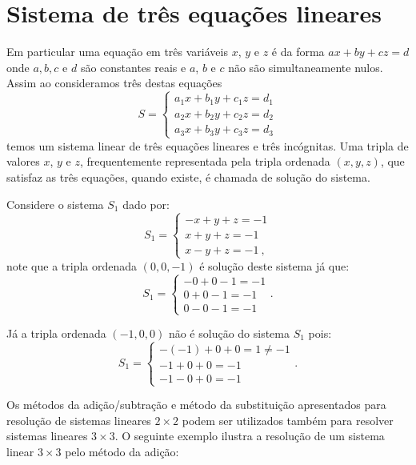 \section{Sistema de três equações lineares}

\vskip0.3cm
 \colorbox{azul}{
 \begin{minipage}{0.9\linewidth}
  Em particular uma equação em três variáveis $x$, $y$ e $z$ é da forma $ax + by + cz= d$ onde $a, b, c$ e $d$ são constantes reais e $a$, $b$ e $c$ não são simultaneamente nulos. Assim ao consideramos três destas equações
  \[S= \begin{cases}
      a_1x + b_1y + c_1z= d_1 \\
      a_2x + b_2y + c_2z= d_2 \\
      a_3x + b_3y + c_3z= d_3
     \end{cases}\]
 temos um sistema linear de três equações lineares e três incógnitas. Uma tripla de valores $x$, $y$ e $z$, frequentemente representada pela tripla ordenada $(x, y, z)$, que satisfaz as três equações, quando existe, é chamada de solução do sistema.
 \end{minipage}}
 \vskip0.3cm




\begin{exem}
 Considere o sistema $S_1$ dado por:
 \[S_1= \begin{cases}
      -x + y + z= -1 \\
      x + y + z= -1 \\
      x - y + z= -1 \ ,
     \end{cases}\]
 note que a tripla ordenada $(0, 0, -1)$ é solução deste sistema já que:
 \[S_1= \begin{cases}
      - 0 + 0 -1 = -1 \\
      0 + 0 -1 = -1\\
      0 - 0 -1 = -1
     \end{cases} .\]

Já a tripla ordenada $(-1, 0, 0)$ não é solução do sistema $S_1$ pois:
\[S_1= \begin{cases}
      -(-1) + 0 + 0= 1 \neq -1 \\
      -1 + 0 + 0 = -1 \\
      -1 -0 + 0 = -1
     \end{cases} .\]
\end{exem}

Os métodos da adição/subtração e método da substituição apresentados para resolução de sistemas lineares $2 \times 2$ podem ser utilizados também para resolver sistemas lineares $3 \times 3$. O seguinte exemplo ilustra a resolução de um sistema linear $3 \times 3$ pelo método da adição:

